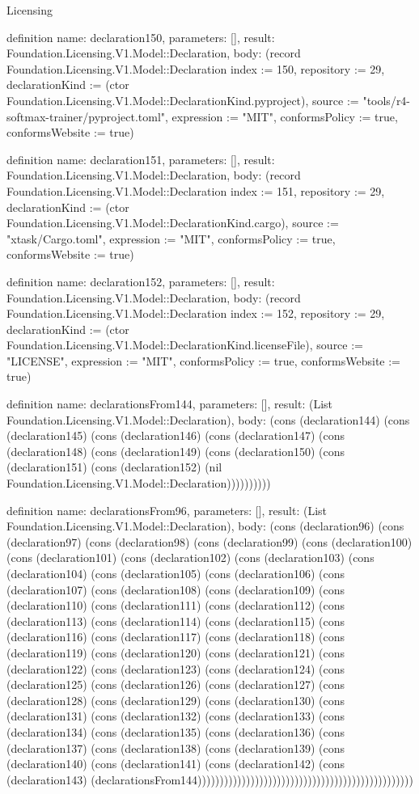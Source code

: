 \begin{lexlean}{Licensing}
\begin{semanticmodule}
definition{
  name: declaration150,
  parameters: [],
  result: Foundation.Licensing.V1.Model::Declaration,
  body: (record Foundation.Licensing.V1.Model::Declaration {index := 150, repository := 29, declarationKind := (ctor Foundation.Licensing.V1.Model::DeclarationKind.pyproject), source := "tools/r4-softmax-trainer/pyproject.toml", expression := "MIT", conformsPolicy := true, conformsWebsite := true})
}

definition{
  name: declaration151,
  parameters: [],
  result: Foundation.Licensing.V1.Model::Declaration,
  body: (record Foundation.Licensing.V1.Model::Declaration {index := 151, repository := 29, declarationKind := (ctor Foundation.Licensing.V1.Model::DeclarationKind.cargo), source := "xtask/Cargo.toml", expression := "MIT", conformsPolicy := true, conformsWebsite := true})
}

definition{
  name: declaration152,
  parameters: [],
  result: Foundation.Licensing.V1.Model::Declaration,
  body: (record Foundation.Licensing.V1.Model::Declaration {index := 152, repository := 29, declarationKind := (ctor Foundation.Licensing.V1.Model::DeclarationKind.licenseFile), source := "LICENSE", expression := "MIT", conformsPolicy := true, conformsWebsite := true})
}

definition{
  name: declarationsFrom144,
  parameters: [],
  result: (List Foundation.Licensing.V1.Model::Declaration),
  body: (cons (declaration144) (cons (declaration145) (cons (declaration146) (cons (declaration147) (cons (declaration148) (cons (declaration149) (cons (declaration150) (cons (declaration151) (cons (declaration152) (nil Foundation.Licensing.V1.Model::Declaration))))))))))
}

definition{
  name: declarationsFrom96,
  parameters: [],
  result: (List Foundation.Licensing.V1.Model::Declaration),
  body: (cons (declaration96) (cons (declaration97) (cons (declaration98) (cons (declaration99) (cons (declaration100) (cons (declaration101) (cons (declaration102) (cons (declaration103) (cons (declaration104) (cons (declaration105) (cons (declaration106) (cons (declaration107) (cons (declaration108) (cons (declaration109) (cons (declaration110) (cons (declaration111) (cons (declaration112) (cons (declaration113) (cons (declaration114) (cons (declaration115) (cons (declaration116) (cons (declaration117) (cons (declaration118) (cons (declaration119) (cons (declaration120) (cons (declaration121) (cons (declaration122) (cons (declaration123) (cons (declaration124) (cons (declaration125) (cons (declaration126) (cons (declaration127) (cons (declaration128) (cons (declaration129) (cons (declaration130) (cons (declaration131) (cons (declaration132) (cons (declaration133) (cons (declaration134) (cons (declaration135) (cons (declaration136) (cons (declaration137) (cons (declaration138) (cons (declaration139) (cons (declaration140) (cons (declaration141) (cons (declaration142) (cons (declaration143) (declarationsFrom144)))))))))))))))))))))))))))))))))))))))))))))))))
}


\end{semanticmodule}
\end{lexlean}
